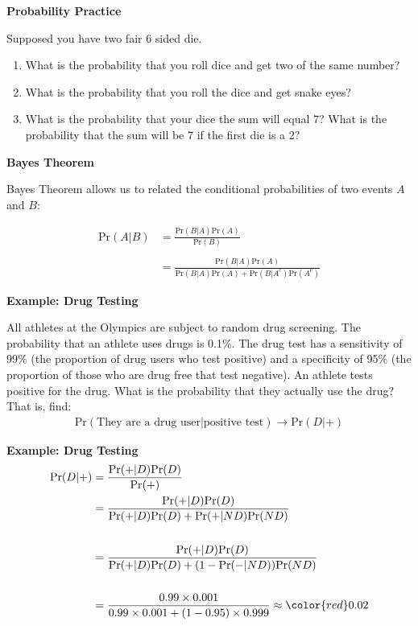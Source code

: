 \documentclass[12pt,xcolor=svgnames]{beamer}
\newcommand{\rd}{\color{red}}
\newcommand{\theme}{\color{FireBrick}}
\newcommand{\sk}{\vspace{.4cm}}
\newcommand{\nsk}{\vspace{-.4cm}}
\newcommand{\chap}[1]{{\theme \Large \bf #1} \sk}
\newcommand{\pr}{\text{Pr}}
\begin{document}
\begin{frame}
\chap{Probability Practice}

Supposed you have two fair 6 sided die. 
\begin{enumerate}
\item What is the probability that you roll dice and get two of the same number?
\item What is the probability that you roll the dice and get snake eyes?
\item What is the probability that your dice the sum will equal 7? What is the probability that the sum will be 7 if the first die is a 2?
\end{enumerate}
\end{frame}


\begin{frame}
\chap{Bayes Theorem} 

Bayes Theorem allows us to related the conditional probabilities of two events $A$ and $B$:

\begin{align*}
\pr(A|B) & = \frac{\pr(B|A)\pr(A)}{\pr(B)}\\
&\\
& =  \frac{\pr(B|A)\pr(A)}{\pr(B|A)\pr(A) + \pr(B|A^c)\pr(A^c)}
\end{align*}

\end{frame}


\begin{frame}
\chap{Example: Drug Testing}

All athletes at the Olympics are subject to random drug screening. The probability that an athlete uses drugs is 0.1\%. The drug test has a sensitivity of 99\% (the proportion of drug users who test positive) and a specificity of 95\% (the proportion of those who are drug free that test negative). An athlete tests positive for the drug. What is the probability that they actually use the drug? That is, find:
\begin{align*}
\pr(\text{They are a drug user}|\text{positive test})\rightarrow \pr(D |+ )
\end{align*}

\end{frame}

\begin{frame}
\chap{Example: Drug Testing}
\nsk
\begin{align*}
\pr(D |+ ) & = \frac{\pr(+|D)\pr(D)}{\pr(+)}\\
& =  \frac{\pr(+|D)\pr(D)}{\pr(+|D)\pr(D) + \pr(+|ND)\pr(ND)}\\
&\\
& =  \frac{\pr(+|D)\pr(D)}{\pr(+|D)\pr(D) + (1-\pr(-|ND))\pr(ND)}\\
&\\
& = \frac{0.99\times0.001}{0.99\times0.001 + (1-0.95)\times0.999} \approx {\rd 0.02} 
\end{align*}


\end{frame}
\end{document}
